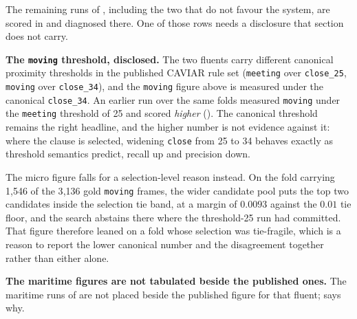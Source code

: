 The remaining runs of , including the two that do not favour the system, are scored in  and diagnosed there. One of those rows needs a disclosure that section does not carry.

\textbf{The \texttt{moving} threshold, disclosed.} The two fluents carry different canonical proximity thresholds in the published CAVIAR rule set (\texttt{meeting} over \texttt{close\_25}, \texttt{moving} over \texttt{close\_34}), and the \texttt{moving} figure above is measured under the canonical \texttt{close\_34}. An earlier run over the same folds measured \texttt{moving} under the \texttt{meeting} threshold of 25 and scored \emph{higher} (). The canonical threshold remains the right headline, and the higher number is not evidence against it: where the clause is selected, widening \texttt{close} from 25 to 34 behaves exactly as threshold semantics predict, recall up and precision down.

The micro figure falls for a selection-level reason instead. On the fold carrying 1{,}546 of the 3{,}136 gold \texttt{moving} frames, the wider candidate pool puts the top two candidates inside the selection tie band, at a margin of $0.0093$ against the $0.01$ tie floor, and the search abstains there where the threshold-25 run had committed. That figure therefore leaned on a fold whose selection was tie-fragile, which is a reason to report the lower canonical number and the disagreement together rather than either alone.

\textbf{The maritime figures are not tabulated beside the published ones.} The maritime runs of  are not placed beside the published figure for that fluent;  says why.


